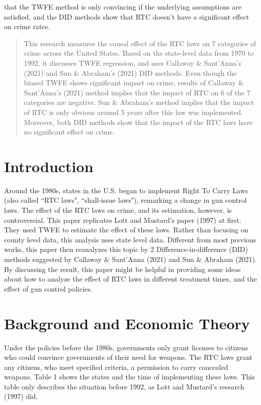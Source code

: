 \documentclass{article}
\begin{document}
that the TWFE method is only convincing if the underlying assumptions are satisfied, and the DID methods show that RTC doesn't have a significant effect on crime rates.

\newpage

\begin{abstract}
    This research measures the causal effect of the RTC laws on 7 categories of crime across the United States. Based on the state-level data from 1970 to 1992, it discusses TWFE regression, and uses Callaway \& Sant'Anna's (2021) and Sun \& Abraham's (2021) DID methods. Even though the biased TWFE shows significant impact on crime, results of Callaway \& Sant'Anna's (2021) method implies that the impact of RTC on 6 of the 7 categories are negative. Sun \& Abraham's method implies that the impact of RTC is only obvious around 5 years after this law was implemented. Moreover, both DID methods show that the impact of the RTC laws have no significant effect on crime. 
\end{abstract}

\section{Introduction}

Around the 1980s, states in the U.S. began to implement Right To Carry Laws (also called ``RTC laws", ``shall-issue laws"), remarking a change in gun control laws. The effect of the RTC laws on crime, and its estimation, however, is controversial. This paper replicates Lott and Mustard's paper (1997) at first. They used TWFE to estimate the effect of these laws. Rather than focusing on county level data, this analysis uses state level data. Different from most previous works, this paper then reanalyzes this topic by 2 Difference-in-difference (DID) methods suggested by Callaway \& Sant'Anna (2021) and Sun \& Abraham (2021). By discussing the result, this paper might be helpful in providing some ideas about how to analyze the effect of RTC laws in different treatment times, and the effect of gun control policies. 

\section{Background and Economic Theory}

Under the policies before the 1980s, governments only grant licenses to citizens who could convince governments of their need for weapons. The RTC laws grant any citizens, who meet specified criteria, a permission to carry concealed weapons. Table 1 shows the states and the time of implementing these laws. This table only describes the situation before 1992, as Lott and Mustard's research (1997) did. 
\end{document}
